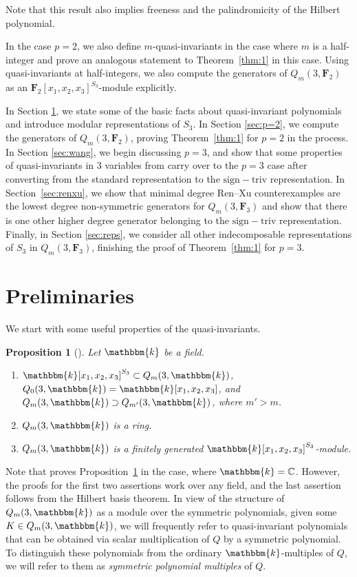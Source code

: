\documentclass[pdftex]{sigma}
\newtheorem{Proposition}[Theorem]{Proposition}
\theoremstyle{definition}
\numberwithin{equation}{section}
\renewcommand{\k}{\mathbbm{k}}
\newcommand{\C}{\mathbb{C}}
\newcommand{\siv}{\mathrm{sign-triv}}
\begin{document}
Note that this result also implies freeness and the palindromicity of the Hilbert polynomial.

In the case $p=2$, we also define $m$-quasi-invariants in the case where $m$ is a half-integer and prove an analogous statement to Theorem~\ref{thm:1} in this case. Using quasi-invariants at half-integers, we also compute the generators of $Q_m(3,\mathbf{F}_2)$ as an $\mathbf{F}_2[x_1,x_2,x_3]^{S_3}$-module explicitly.

In Section \ref{prelim}, we state some of the basic facts about quasi-invariant polynomials and introduce modular representations of $S_3$. In Section \ref{sec:p=2}, we compute the generators of $Q_m(3,\mathbf{F}_2)$, proving Theorem~\ref{thm:1} for $p=2$ in the process. In Section \ref{sec:wang}, we begin discussing $p=3$, and show that some properties of quasi-invariants in 3 variables from \cite{wang2022explicit} carry over to the $p=3$ case after converting from the standard representation to the $\siv$ representation. In Section~\ref{sec:renxu}, we show that minimal degree Ren--Xu counterexamples are the lowest degree non-symmetric generators for $Q_m(3,\mathbf{F}_3)$ and show that there is one other higher degree generator belonging to the $\siv$ representation. Finally, in Section \ref{sec:reps}, we consider all other indecomposable representations of $S_3$ in $Q_m(3,\mathbf{F}_3)$, finishing the proof of Theorem~\ref{thm:1} for $p=3$.

\section{Preliminaries}\label{prelim}
We start with some useful properties of the quasi-invariants.
\begin{Proposition}[\cite{etingof2002lectures}]\label{firstProp}
 Let $\k$ be a field.
\begin{enumerate}\itemsep=0pt
 \item[$1$.] $\k[x_1,x_2,x_3]^{S_3}\subset Q_m(3,\k)$, $Q_0(3,\k) = \k[x_1,x_2,x_3]$, and $Q_m(3,\k)\supset Q_{m'}(3,\k)$, where ${m'>m}$.
 \item[$2$.] $Q_m(3,\k)$ is a ring.
 \item[$3$.] $Q_m(3,\k)$ is a finitely generated $\k[x_1,x_2,x_3]^{S_3}$-module.
\end{enumerate}
\end{Proposition}

Note that \cite{etingof2002lectures} proves Proposition~\ref{firstProp} in the case, where $\k=\C$. However, the proofs for the first two assertions work over any field, and the last assertion follows from the Hilbert basis theorem. In view of the structure of $Q_m(3,\k)$ as a module over the symmetric polynomials, given some $K\in Q_m(3,\k)$, we will frequently refer to quasi-invariant polynomials that can be obtained via scalar multiplication of $Q$ by a symmetric polynomial. To distinguish these polynomials from the ordinary $\k$-multiples of $Q$, we will refer to them as \emph{symmetric polynomial multiples} of $Q$.
\end{document}
